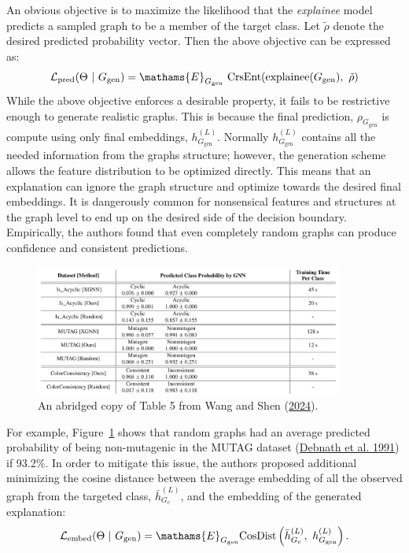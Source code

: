 \documentclass[
  11pt,
  letterpaper,
]{article}
\begin{document}
\quad An obvious objective is to maximize the likelihood that the
\emph{explainee} model predicts a sampled graph to be a member of the
target class. Let \(\tilde{\rho}\) denote the desired predicted
probability vector. Then the above objective can be expressed as:
\begin{equation}
        \mathcal{L}_\text{pred} (\Theta \ | \ G_\text{gen}) = \mathams{E}_{G_\text{gen}} \ \text{CrsEnt} (\text{explainee}(G_\text{gen}), \ \tilde{\rho})
    \end{equation} While the above objective enforces a desirable
property, it fails to be restrictive enough to generate realistic
graphs. This is because the final prediction, \(\rho_{G_{\text{gen}}}\)
is compute using only final embeddings, \(h^{(L)}_{G_{\text{gen}}}\).
Normally \(h^{(L)}_{G_{\text{gen}}}\) contains all the needed
information from the graphs structure; however, the generation scheme
allows the feature distribution to be optimized directly. This means
that an explanation can ignore the graph structure and optimize towards
the desired final embeddings. It is dangerously common for nonsensical
features and structures at the graph level to end up on the desired side
of the decision boundary. Empirically, the authors found that even
completely random graphs can produce confidence and consistent
predictions.

\begin{figure}

{\centering \includegraphics[width=0.9\textwidth,height=\textheight]{figures/random_baseline.png}

}

\caption{\label{fig-random-baseline}An abridged copy of Table 5 from
Wang and Shen (\protect\hyperlink{ref-Wang_Shen_2024}{2024}).}

\end{figure}

For example, Figure~\ref{fig-random-baseline} shows that random graphs
had an average predicted probability of being non-mutagenic in the MUTAG
dataset (\protect\hyperlink{ref-Debnath_1991}{Debnath et al. 1991}) if
93.2\%. In order to mitigate this issue, the authors proposed additional
minimizing the cosine distance between the average embedding of all the
observed graph from the targeted class, \(\bar h^{(L)}_{G_c}\), and the
embedding of the generated explanation: \begin{equation}
       \mathcal{L}_{\text{embed}}(\Theta \ | \ G_\text{gen}) = 
            \mathams{E}_{G_\text{gen}}
            \text{CosDist}\left( \bar h^{(L)}_{G_c}, \ h^{(L)}_{G_\text{gen}} \right). 
    \end{equation}
\end{document}
